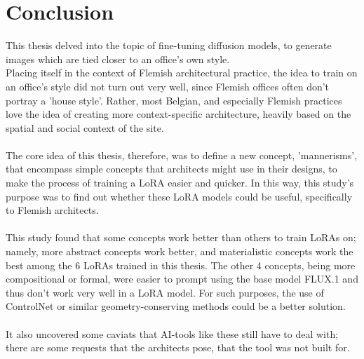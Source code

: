 \chapter{Conclusion}

This thesis delved into the topic of fine-tuning diffusion models, to generate images which are tied closer to an office's own style.\\
Placing itself in the context of Flemish architectural practice, the idea to train on an office's style did not turn out very well, since Flemish offices often don't portray a 'house style'. Rather, most Belgian, and especially Flemish practices love the idea of creating more context-specific architecture, heavily based on the spatial and social context of the site.\\
\\
The core idea of this thesis, therefore, was to define a new concept, 'mannerisms', that encompass simple concepts that architects might use in their designs, to make the process of training a LoRA easier and quicker. In this way, this study's purpose was to find out whether these LoRA models could be useful, specifically to Flemish architects.\\
\\
This study found that some concepts work better than others to train LoRAs on; namely, more abstract concepts work better, and materialistic concepts work the best among the 6 LoRAs trained in this thesis. The other 4 concepts, being more compositional or formal, were easier to prompt using the base model FLUX.1 and thus don't work very well in a LoRA model. For such purposes, the use of ControlNet or similar geometry-conserving methods could be a better solution.\\
\\
It also uncovered some caviats that AI-tools like these still have to deal with; there are some requests that the architects pose, that the tool was not built for. 
